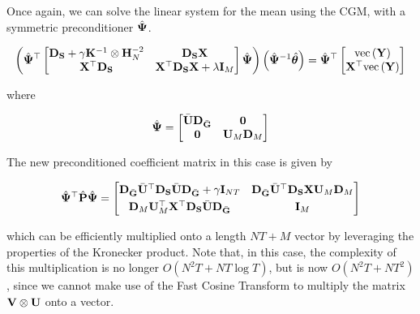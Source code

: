 Once again, we can solve the linear system for the mean using the CGM, with a symmetric preconditioner $\hat{\mathbf{\Psi}}$.  

\begin{equation}
    \left( \hat{\mathbf{\Psi}}^\top \begin{bmatrix}
        \mathbf{D}_{\mathbf{S}} + \gamma \mathbf{K}^{-1} \otimes \mathbf{H}_N^{-2} & \mathbf{D}_{\mathbf{S}}  \mathbf{X} \\
        \mathbf{X}^\top \mathbf{D}_{\mathbf{S}} & \mathbf{X}^\top \mathbf{D}_{\mathbf{S}} \mathbf{X} + \lambda \mathbf{I}_M   
       \end{bmatrix}  \hat{\mathbf{\Psi}} \right) \left( \hat{\mathbf{\Psi}}^{-1} \hat{\boldsymbol{\theta}}\right)   = \hat{\mathbf{\Psi}}^\top \begin{bmatrix} \text{\textup{vec}}\left(\mathbf{Y}\right) \\ \mathbf{X}^\top \text{\textup{vec}}\left(\mathbf{Y}\right) \end{bmatrix}
\end{equation}

where 

\begin{equation}
    \hat{\mathbf{\Psi}} =  \begin{bmatrix}
        \bar{\mathbf{U}} \mathbf{D}_{\bar{\mathbf{G}}} & \mathbf{0} \\
        \mathbf{0} & \mathbf{U}_M \mathbf{D}_M 
    \end{bmatrix}
\end{equation}

The new preconditioned coefficient matrix in this case is given by 

\begin{equation*}
    \hat{\mathbf{\Psi}}^\top \hat{\mathbf{P}}  \hat{\mathbf{\Psi}} = 
       \begin{bmatrix}
        \mathbf{D}_{\bar{\mathbf{G}}} \bar{\mathbf{U}}^\top \mathbf{D}_{\mathbf{S}} \bar{\mathbf{U}} \mathbf{D}_{\bar{\mathbf{G}}} + \gamma \mathbf{I}_{NT}  &  \mathbf{D}_{\bar{\mathbf{G}}} \bar{\mathbf{U}}^\top \mathbf{D}_{\mathbf{S}} \mathbf{X} \mathbf{U}_M \mathbf{D}_M \\[0.1cm] 
        \mathbf{D}_M \mathbf{U}_M^\top \mathbf{X}^\top \mathbf{D}_{\mathbf{S}} \bar{\mathbf{U}} \mathbf{D}_{\bar{\mathbf{G}}} & \mathbf{I}_M
        \end{bmatrix}
\end{equation*}

which can be efficiently multiplied onto a length $NT + M$ vector by leveraging the properties of the Kronecker product. Note that, in this case, the complexity of this multiplication is no longer $O(N^2T + NT \log T)$, but is now $O(N^2T + NT^2)$, since we cannot make use of the Fast Cosine Transform to multiply the matrix $\mathbf{V} \otimes \mathbf{U}$ onto a vector. 
